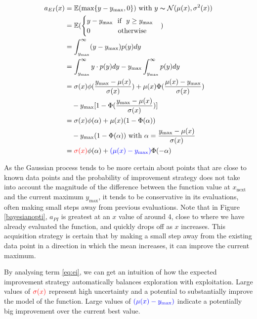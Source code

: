 \documentclass[a4paper,12pt,twoside,openright]{report}
\begin{document}
\begin{align}
a_{EI}(x) &= \mathbb{E}(\text{max}\{y - y_{\text{max}}, 0\}) \text{\ with\ } y \thicksim \mathcal{N}(\mu(x),\sigma^2(x))\\
&= \mathbb{E}(\begin{cases}
        y-y_{\text{max}} \text{\ \ if\ \ } y \geq y_{\text{max}}
        \\
        0 \text{\ \ \ \ \ \ \ \ \ \ \ \ otherwise}
        \end{cases})\\
&= \int_{y_{\text{max}}}^\infty (y-y_{\text{max}})p(y)dy\\
&= \int_{y_{\text{max}}}^\infty y\cdot p(y)dy-y_{\text{max}}\int_{y_{\text{max}}}^\infty p(y)dy\\
&= \sigma(x)\phi(\frac{y_{\text{max}}-\mu(x)}{\sigma(x)}) + \mu(x)\Phi(\frac{\mu(x) - y_{\text{max}}}{\sigma(x)}) \\
&\quad - y_{\text{max}}[1-\Phi(\frac{y_{\text{max}} - \mu(x)}{\sigma(x)})]\\
&= \sigma(x)\phi(\alpha) + \mu(x)(1-\Phi(\alpha))\\
&\quad - y_{\text{max}}(1-\Phi(\alpha)) \text{\ with\ } \alpha = \frac{y_{\text{max}}-\mu(x)}{\sigma(x)}\\
&= {\color{red}\sigma(x)}\phi(\alpha) + {\color{blue}(\mu(x)- y_{\text{max}})}\Phi(-\alpha) \label{eq:ei}
\end{align}

As the Gaussian process tends to be more certain about points that are close to known data points and the probability of improvement strategy does not take into account the magnitude of the difference between the function value at $x_{\text{next}}$ and the current maximum $y_{\text{max}}$, it tends to be conservative in its evaluations, often making small steps away from previous evaluations. Note that in Figure \ref{bayesianopti}, $a_{PI}$ is greatest at an $x$ value of around 4, close to where we have already evaluated the function, and quickly drops off as $x$ increases. This acquisition strategy is certain that by making a small step away from the existing data point in a direction in which the mean increases, it can improve the current maximum.

By analysing term \ref{eq:ei}, we can get an intuition of how the expected improvement strategy automatically balances exploration with exploitation. Large values of ${\color{red}\sigma(x)}$ represent high uncertainty and a potential to substantially improve the model of the function. Large values of ${\color{blue}(\mu(x)- y_{\text{max}})}$ indicate a potentially big improvement over the current best value.
\end{document}
